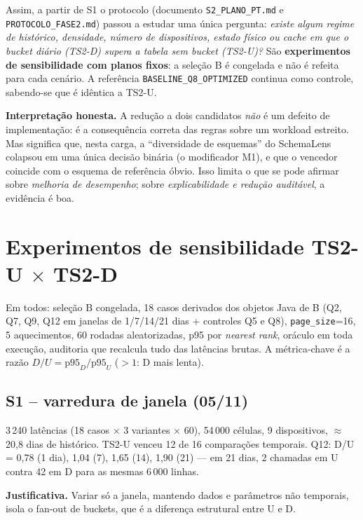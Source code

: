 \documentclass[11pt,a4paper]{article}
\newcommand{\caixa}[2][boxbg]{\par\smallskip\noindent\colorbox{#1}{\parbox{\dimexpr\linewidth-2\fboxsep}{#2}}\par\smallskip}
\newcommand{\just}[1]{\caixa{\textbf{Justificativa.} #1}}
\begin{document}
Assim, a partir de S1 o protocolo (documento \texttt{S2\_PLANO\_PT.md} e \texttt{PROTOCOLO\_FASE2.md}) passou a estudar uma única pergunta: \emph{existe algum regime de histórico, densidade, número de dispositivos, estado físico ou cache em que o bucket diário (TS2-D) supera a tabela sem bucket (TS2-U)?} São \textbf{experimentos de sensibilidade com planos fixos}: a seleção B é congelada e não é refeita para cada cenário. A referência \texttt{BASELINE\_Q8\_OPTIMIZED} continua como controle, sabendo-se que é idêntica a TS2-U.

\caixa[warnbg]{\textbf{Interpretação honesta.} A redução a dois candidatos \emph{não} é um defeito de implementação: é a consequência correta das regras sobre um workload estreito. Mas significa que, nesta carga, a ``diversidade de esquemas'' do SchemaLens colapsou em uma única decisão binária (o modificador M1), e que o vencedor coincide com o esquema de referência óbvio. Isso limita o que se pode afirmar sobre \emph{melhoria de desempenho}; sobre \emph{explicabilidade e redução auditável}, a evidência é boa.}

\section{Experimentos de sensibilidade TS2-U $\times$ TS2-D}

Em todos: seleção B congelada, 18 casos derivados dos objetos Java de B (Q2, Q7, Q9, Q12 em janelas de 1/7/14/21 dias + controles Q5 e Q8), \texttt{page\_size}=16, 5 aquecimentos, 60 rodadas aleatorizadas, p95 por \emph{nearest rank}, oráculo em toda execução, auditoria que recalcula tudo das latências brutas. A métrica-chave é a razão $D/U = \text{p95}_{D}/\text{p95}_{U}$ ($>1$: D mais lenta).

\subsection{S1 -- varredura de janela (05/11)}
3\,240 latências (18 casos $\times$ 3 variantes $\times$ 60), 54\,000 células, 9 dispositivos, $\approx$20,8 dias de histórico. TS2-U venceu 12 de 16 comparações temporais. Q12: D/U = 0,78 (1 dia), 1,04 (7), 1,65 (14), 1,90 (21) --- em 21 dias, 2 chamadas em U contra 42 em D para as mesmas 6\,000 linhas.

\just{Variar só a janela, mantendo dados e parâmetros não temporais, isola o fan-out de buckets, que é a diferença estrutural entre U e D.}
\end{document}
